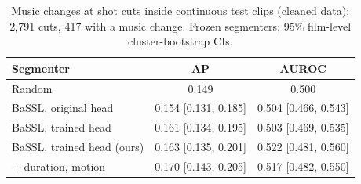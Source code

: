 \begin{table}[t]
\centering
\small
\setlength{\tabcolsep}{3pt}
\caption{Music changes at shot cuts inside continuous test clips (cleaned data): 2{,}791 cuts, 417 with a music change. Frozen segmenters; 95\% film-level cluster-bootstrap CIs.}
\label{tab:supp_incut}
\begin{tabular}{@{}lcc@{}}
\toprule
Segmenter & AP & AUROC \\
\midrule
Random & 0.149 & 0.500 \\
BaSSL, original head & 0.154 [0.131, 0.185] & 0.504 [0.466, 0.543] \\
BaSSL, trained head & 0.161 [0.134, 0.195] & 0.503 [0.469, 0.535] \\
BaSSL, trained head (ours) & 0.163 [0.135, 0.201] & 0.522 [0.481, 0.560] \\
+ duration, motion & 0.170 [0.143, 0.205] & 0.517 [0.482, 0.550] \\
\bottomrule
\end{tabular}
\end{table}
